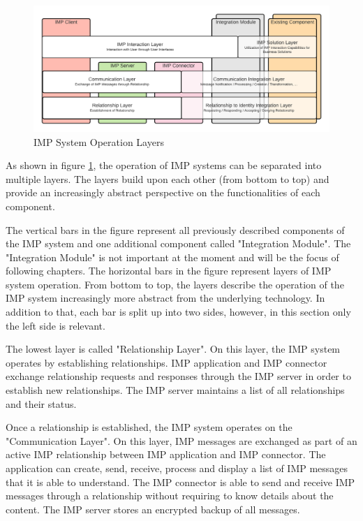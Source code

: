 \begin{figure}[h!]
    \centering
    \includegraphics[scale=0.6]{Diagrams/IMP Layer Diagram.pdf}
    \caption{IMP System Operation Layers}
    \label{imp:layer_diagram}
\end{figure}

As shown in figure \ref{imp:layer_diagram}, the operation of IMP systems can be separated into multiple layers. The layers build upon each other (from bottom to top) and provide an increasingly abstract perspective on the functionalities of each component. 

The vertical bars in the figure represent all previously described components of the IMP system and one additional component called "Integration Module". The "Integration Module" is not important at the moment and will be the focus of following chapters. The horizontal bars in the figure represent layers of IMP system operation. From bottom to top, the layers describe the operation of the IMP system increasingly more abstract from the underlying technology. In addition to that, each bar is split up into two sides, however, in this section only the left side is relevant.

The lowest layer is called "Relationship Layer". On this layer, the IMP system operates by establishing relationships. IMP application and IMP connector exchange relationship requests and responses through the IMP server in order to establish new relationships. The IMP server maintains a list of all relationships and their status.

Once a relationship is established, the IMP system operates on the "Communication Layer". On this layer, IMP messages are exchanged as part of an active IMP relationship between IMP application and IMP connector. The application can create, send, receive, process and display a list of IMP messages that it is able to understand. The IMP connector is able to send and receive IMP messages through a relationship without requiring to know details about the content. The IMP server stores an encrypted backup of all messages.

